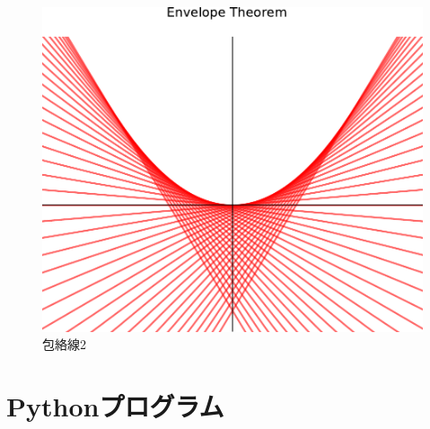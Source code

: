 \documentclass[11pt,a4j,fleqn]{jarticle}
\begin{document}
\begin{figure}
 \centering
 \includegraphics{envelope1.pdf}
 \caption{包絡線2}
 \label{fig:2}
\end{figure}










\section{Pythonプログラム}
\end{document}
